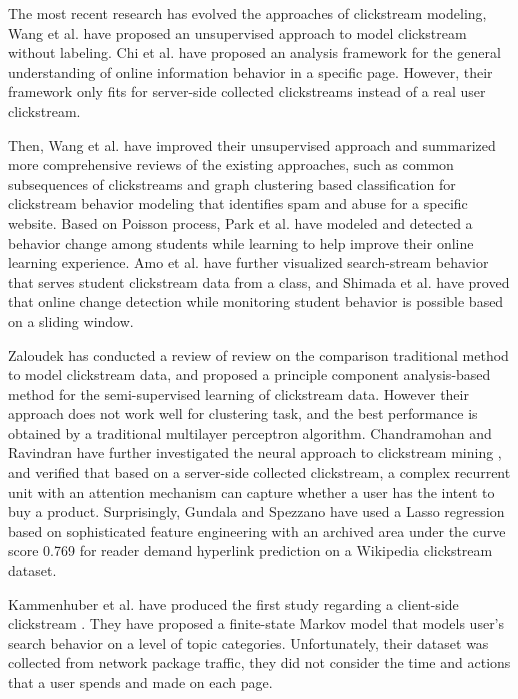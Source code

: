 The most recent research has evolved the approaches of clickstream modeling,
Wang et al.\cite{Wang:2016:UCC:2858036.2858107} have proposed an unsupervised approach 
to model clickstream without labeling.
Chi et al. have proposed an analysis framework \cite{chi2017towards} for the general understanding 
of online information behavior in a specific page. 
However, their framework only fits for server-side collected clickstreams instead of 
a real user clickstream.

Then, Wang et al. \cite{Wang:2017:CUB:3127338.3068332} have improved their unsupervised approach
and summarized more comprehensive reviews of the existing approaches, 
such as common subsequences of clickstreams and graph clustering based classification 
for clickstream behavior modeling that identifies spam and abuse for a specific website. 
Based on Poisson process, Park et al. have modeled and detected a behavior change 
among students while learning \cite{Park:2017:DCS:3027385.3027430} to
help improve their online learning experience. Amo et al. \cite{amo2018learning} have 
further visualized search-stream behavior that serves student clickstream data from a class, 
and Shimada et al. have proved \cite{Shimada:2018:OCD:3170358.3170412} that
online change detection while monitoring student behavior is possible based on a sliding window.

Zaloudek has conducted a review of review on the comparison \cite{mastersthesis} traditional method 
to model clickstream data, and proposed a principle component analysis-based method for 
the semi-supervised learning of clickstream data. 
However their approach does not work well for clustering task, and 
the best performance is obtained by a traditional multilayer perceptron algorithm.
Chandramohan and Ravindran have further investigated the neural approach to clickstream mining \cite{N:2018:NAB:3152494.3152505},
and verified that based on a server-side collected clickstream, a complex recurrent unit 
with an attention mechanism can capture whether a user
has the intent to buy a product.
Surprisingly, Gundala and Spezzano \cite{Gundala:2018:RDH:3184558.3191644} have used a Lasso
regression based on sophisticated feature engineering with an 
archived area under the curve score 0.769 for reader demand hyperlink prediction 
on a Wikipedia clickstream dataset.

Kammenhuber et al. have produced the first study
regarding a client-side clickstream \cite{Kammenhuber:2006:WSC:1177080.1177110}. 
They have proposed a finite-state Markov model that models user's search behavior on a level of
topic categories. Unfortunately, their dataset was collected from network package traffic,
they did not consider the time and actions that a user spends and made on each page.



